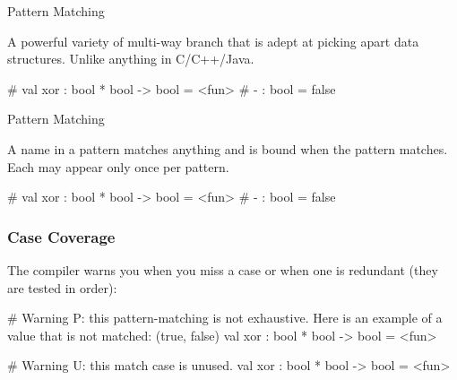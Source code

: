 \documentclass{plt}
\begin{document}
\begin{frame}[fragile]{Pattern Matching}

A powerful variety of multi-way branch that is adept at picking apart
data structures.  Unlike anything in C/C++/Java.

\begin{interactive}
# 
val xor : bool * bool -> bool = <fun>
# 
- : bool = false
\end{interactive}
\end{frame}

\begin{frame}[fragile]{Pattern Matching}

A name in a pattern matches anything and is bound when the pattern
matches.  Each may appear only once per pattern.

\begin{interactive}
# 
val xor : bool * bool -> bool = <fun>
# 
- : bool = false
\end{interactive}

\end{frame}

\begin{frame}[fragile]
  \frametitle{Case Coverage}

The compiler warns you when you miss a case or when one is redundant
(they are tested in order):

\begin{interactive}
# 
Warning P: this pattern-matching is not exhaustive.
Here is an example of a value that is not matched:
(true, false)
val xor : bool * bool -> bool = <fun>

# 
Warning U: this match case is unused.
val xor : bool * bool -> bool = <fun>
\end{interactive}

\end{frame}
\end{document}

